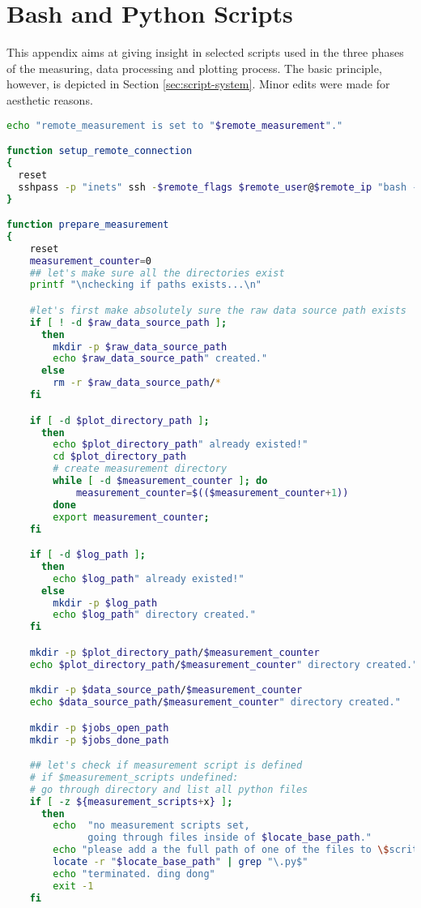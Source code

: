 \chapter{Bash and Python Scripts}

This appendix aims at giving insight in selected scripts used in the three phases of the measuring, data processing and plotting process. The basic principle, however, is depicted in Section \ref{sec:script-system}. Minor edits were made for aesthetic reasons.

\begin{lstlisting}[language=Bash,caption=measure.sh]
echo "remote_measurement is set to "$remote_measurement"."

function setup_remote_connection
{
  reset
  sshpass -p "inets" ssh -$remote_flags $remote_user@$remote_ip "bash -s" < remote_measurement_$link.sh
}

function prepare_measurement
{
    reset
    measurement_counter=0
    ## let's make sure all the directories exist
    printf "\nchecking if paths exists...\n"

    #let's first make absolutely sure the raw data source path exists
    if [ ! -d $raw_data_source_path ];
      then
        mkdir -p $raw_data_source_path
        echo $raw_data_source_path" created."
      else
        rm -r $raw_data_source_path/*
    fi

    if [ -d $plot_directory_path ];
      then
        echo $plot_directory_path" already existed!"
        cd $plot_directory_path
        # create measurement directory
        while [ -d $measurement_counter ]; do
            measurement_counter=$(($measurement_counter+1))
        done
        export measurement_counter;
    fi

    if [ -d $log_path ];
      then
        echo $log_path" already existed!"
      else
        mkdir -p $log_path
        echo $log_path" directory created."
    fi

    mkdir -p $plot_directory_path/$measurement_counter
    echo $plot_directory_path/$measurement_counter" directory created."

    mkdir -p $data_source_path/$measurement_counter
    echo $data_source_path/$measurement_counter" directory created."

    mkdir -p $jobs_open_path
    mkdir -p $jobs_done_path

    ## let's check if measurement script is defined
    # if $measurement_scripts undefined:
    # go through directory and list all python files
    if [ -z ${measurement_scripts+x} ];
      then
        echo  "no measurement scripts set,
              going through files inside of $locate_base_path."
        echo "please add a the full path of one of the files to \$scritps."
        locate -r "$locate_base_path" | grep "\.py$"
        echo "terminated. ding dong"
        exit -1
    fi


\end{lstlisting}
